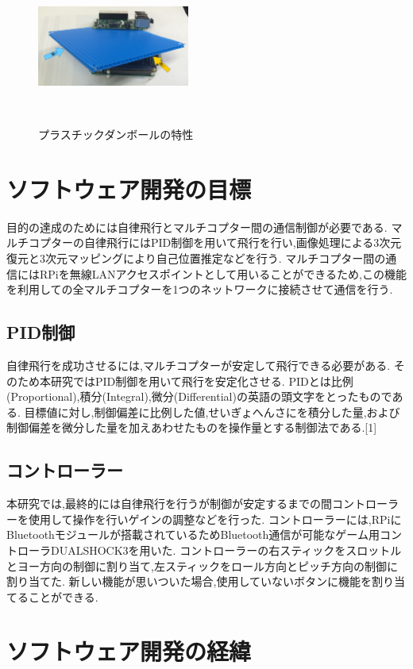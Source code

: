 \documentclass[a4paper]{jarticle}
\begin{document}
\begin{figure}[htbp]
 \begin{center}
  \includegraphics[width=50mm]{image/cardboard.png}
 　\caption{プラスチックダンボールの特性}
 　\label{fig:cardboard}
 \end{center}
\end{figure}

\section{ソフトウェア開発の目標}
目的の達成のためには自律飛行とマルチコプター間の通信制御が必要である.
マルチコプターの自律飛行にはPID制御を用いて飛行を行い,画像処理による3次元復元と3次元マッピングにより自己位置推定などを行う.
マルチコプター間の通信にはRPiを無線LANアクセスポイントとして用いることができるため,この機能を利用しての全マルチコプターを1つのネットワークに接続させて通信を行う.

\subsection{PID制御}
自律飛行を成功させるには,マルチコプターが安定して飛行できる必要がある.
そのため本研究ではPID制御を用いて飛行を安定化させる.
PIDとは比例(Proportional),積分(Integral),微分(Differential)の英語の頭文字をとったものである.
目標値に対し,制御偏差に比例した値,せいぎょへんさにを積分した量,および制御偏差を微分した量を加えあわせたものを操作量とする制御法である.[1]

\subsection{コントローラー}
本研究では,最終的には自律飛行を行うが制御が安定するまでの間コントローラーを使用して操作を行いゲインの調整などを行った.
コントローラーには,RPiにBluetoothモジュールが搭載されているためBluetooth通信が可能なゲーム用コントローラDUALSHOCK3を用いた.
コントローラーの右スティックをスロットルとヨー方向の制御に割り当て,左スティックをロール方向とピッチ方向の制御に割り当てた.
新しい機能が思いついた場合,使用していないボタンに機能を割り当てることができる.

\section{ソフトウェア開発の経緯}
\end{document}
